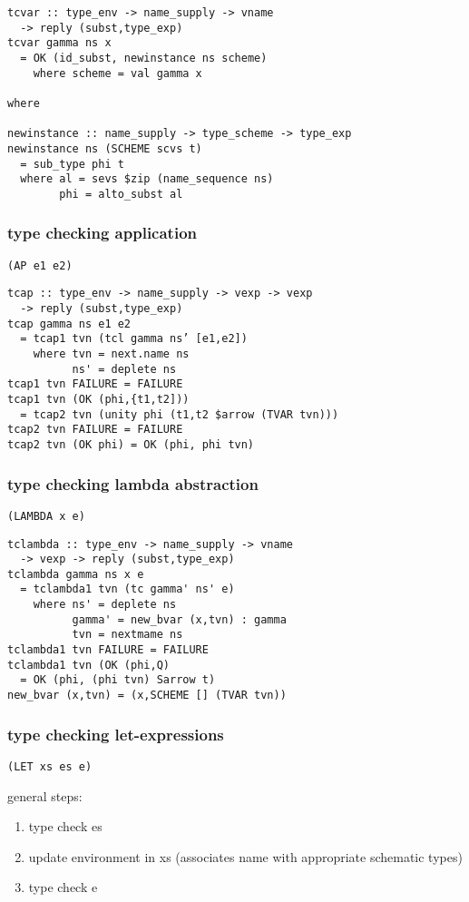 \documentclass[8pt]{extarticle}
\begin{document}
\begin{multicols*}{2}
\begin{verbatim}
tcvar :: type_env -> name_supply -> vname
  -> reply (subst,type_exp)
tcvar gamma ns x
  = OK (id_subst, newinstance ns scheme)
    where scheme = val gamma x

where

newinstance :: name_supply -> type_scheme -> type_exp
newinstance ns (SCHEME scvs t)
  = sub_type phi t
  where al = sevs $zip (name_sequence ns)
        phi = alto_subst al
\end{verbatim}
\subsubsection{type checking application}

\verb|(AP e1 e2)|

\begin{verbatim}
tcap :: type_env -> name_supply -> vexp -> vexp
  -> reply (subst,type_exp)
tcap gamma ns e1 e2
  = tcap1 tvn (tcl gamma ns’ [e1,e2])
    where tvn = next.name ns
          ns' = deplete ns
tcap1 tvn FAILURE = FAILURE
tcap1 tvn (OK (phi,{t1,t2]))
  = tcap2 tvn (unity phi (t1,t2 $arrow (TVAR tvn)))
tcap2 tvn FAILURE = FAILURE
tcap2 tvn (OK phi) = OK (phi, phi tvn)
\end{verbatim}
\subsubsection{type checking lambda abstraction}

\verb|(LAMBDA x e)|

\begin{verbatim}
tclambda :: type_env -> name_supply -> vname
  -> vexp -> reply (subst,type_exp)
tclambda gamma ns x e
  = tclambda1 tvn (tc gamma' ns' e)
    where ns' = deplete ns
          gamma' = new_bvar (x,tvn) : gamma
          tvn = nextmame ns
tclambda1 tvn FAILURE = FAILURE
tclambda1 tvn (OK (phi,Q)
  = OK (phi, (phi tvn) Sarrow t)
new_bvar (x,tvn) = (x,SCHEME [] (TVAR tvn))
\end{verbatim}

\subsubsection{type checking let-expressions}

\verb|(LET xs es e)|

general steps:
\begin{enumerate}
\item type check es
\item update environment in xs (associates name with appropriate schematic types)
\item type check e
\end{enumerate}


\end{multicols*}
\end{document}
